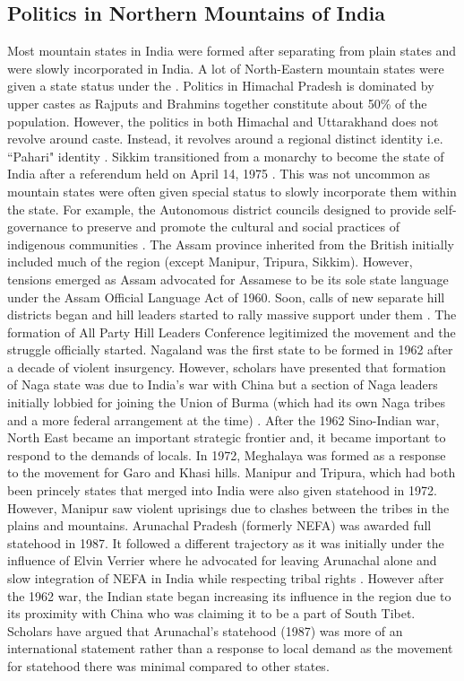 \begin{sloppypar}
\subsection{Politics in Northern Mountains of India}

Most mountain states in India were formed after separating from plain states and were slowly incorporated in India. A lot of North-Eastern mountain states were given a state status under the \cite{North_eastern_reorg_1971}.  Politics in Himachal Pradesh is dominated by upper castes as  Rajputs and Brahmins together constitute about 50\% of the population. However, the politics in both Himachal and Uttarakhand does not revolve around caste. Instead, it revolves around a regional distinct identity i.e. ``Pahari" identity \citep{mishra2000politics}. Sikkim transitioned from a monarchy to become the  state of India after a referendum held on April 14, 1975 \citep{code1979volume}. This was not uncommon as mountain states were often given special status to slowly incorporate them within the state. For example, the Autonomous district councils  designed to provide self-governance to preserve and promote the cultural and social practices of indigenous communities \citep{pautunthang2024india}. The Assam province inherited from the British initially included much of the region (except Manipur, Tripura, Sikkim). However, tensions emerged as Assam advocated for Assamese to be its sole state language under the Assam Official Language Act of 1960. Soon, calls of new separate hill districts began and hill leaders started to rally massive support under them \citep{inoue2005integration}. The formation of All Party Hill Leaders Conference legitimized the movement and the struggle officially started. Nagaland was the first state to be formed in 1962 after a decade of violent insurgency. However, scholars have presented that formation of Naga state was due to India's war with China but a section of Naga leaders initially lobbied for joining the Union of Burma (which had its own Naga tribes and a more federal arrangement at the time) \citep{Wouters_2023,johari1975creation}. After the 1962 Sino-Indian war, North East became an important strategic frontier and, it became important to respond to the demands of locals. In 1972, Meghalaya was formed as a response to the movement for Garo and Khasi hills. Manipur and Tripura, which had both been princely states that merged into India were also given statehood in 1972. However, Manipur saw violent uprisings due to clashes between the tribes in the plains and mountains. Arunachal Pradesh (formerly NEFA) was awarded full statehood in 1987. It followed a different trajectory as it was initially under the influence of Elvin Verrier where he advocated for leaving Arunachal alone and slow integration of NEFA in India while respecting tribal rights \citep{verrier_elvin_2008}. However after the 1962 war, the Indian state began increasing its influence in the region due to its proximity with China who was claiming it to be a part of South Tibet. Scholars have argued that Arunachal’s statehood (1987) was  more of an international statement rather than a response to local demand as the movement for statehood there was minimal compared to other states.


\end{sloppypar}
